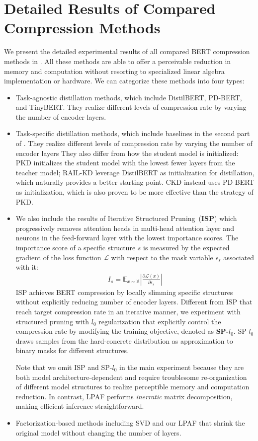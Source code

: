 	
	\section{Detailed Results of Compared Compression Methods}
	\label{sec:appendixC}
	
	
	We present the detailed experimental results of all compared BERT compression methods in . All these methods are able to offer a perceivable reduction in memory and computation without resorting to specialized linear algebra implementation or hardware. We can categorize these methods into four types: 
	\begin{itemize}
		\item Task-agnostic distillation methods, which include DistilBERT, PD-BERT, and TinyBERT. They realize different levels of compression rate by varying the number of encoder layers.
		\item Task-specific distillation methods, which include baselines in the second part of . They realize different levels of compression rate by varying the number of encoder layers They also differ from how the student model is initialized: PKD initializes the student model with the lowest fewer layers from the teacher model; RAIL-KD leverage DistilBERT as initialization for distillation, which naturally provides a 
		better starting point. CKD instead uses PD-BERT as initialization, which is also proven to be more effective  than the strategy of PKD.
		\item We also include the results of  Iterative Structured Pruning~(\textbf{ISP}) which progressively removes attention heads in multi-head attention layer and neurons in the feed-forward layer with the lowest importance scores. The importance score of a specific structure $s$ is measured by the expected gradient of the loss function $\mathcal{L}$ with respect to the mask variable $\epsilon_s$ associated with it:
		\begin{align}
			I_s = \mathbb{E}_{x\sim \mathbb{X}}|\frac{\partial \mathcal{L}(x)}{\partial \epsilon_s}|
		\end{align}
		ISP achieves BERT compression by locally slimming specific structures without explicitly reducing number of encoder layers. Different from ISP that reach target compression rate in an iterative manner, we experiment with structured pruning with $l_0$ regularization that explicitly control the compression rate by modifying the  training objective, denoted as \textbf{SP-$l_0$}. SP-$l_0$ draws samples from the hard-concrete distribution as approximation to binary masks for different structures.
		
		Note that we omit ISP and SP-$l_0$ in the main experiment because they are both model architecture-dependent and require troublesome re-organization of different model structures to realize perceptible memory and computation reduction. In contrast, LPAF performs \textit{inerratic} matrix decomposition, making efficient inference straightforward.
				\item Factorization-based methods including SVD and our LPAF that shrink the original model without changing the number of layers.
	\end{itemize}
	
